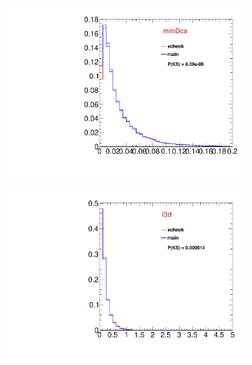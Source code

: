 \begin{figure}
\begin{subfigure}[b]{0.2\textwidth}
                \includegraphics[width=\textwidth]{Figures/VariablesComparison/MC_barrel_figs/docatrk}
                \label{fig:MC_barrel_docatrk}
        \end{subfigure}
        \begin{subfigure}[b]{0.2\textwidth}
                \centering
                \includegraphics[width=\textwidth]{Figures/VariablesComparison/MC_barrel_figs/fl3d}
                \label{fig:MC_barrel_fl3d}
        \end{subfigure}
        \begin{subfigure}[b]{0.2\textwidth}
                \centering

\end{subfigure}
\end{figure}
